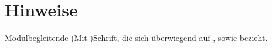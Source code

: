 \section*{Hinweise}
Modulbegleitende (Mit-)Schrift, die sich überwiegend auf \cite{Wed09}, \cite{Wed09b} sowie \cite{Buh09} bezieht.